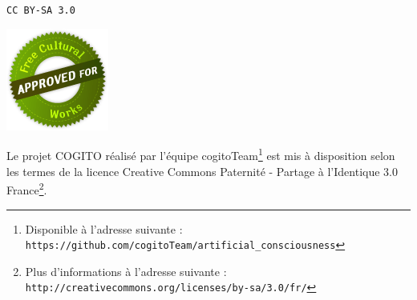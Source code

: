 \chapter*{}
\begin{center}
\texttt{\LARGE CC BY-SA 3.0}

\includegraphics[scale=0.8]{files/free}

Le projet COGITO réalisé par l'équipe cogitoTeam\footnote{Disponible à l'adresse suivante : \texttt{https://github.com/cogitoTeam/artificial\_consciousness}} est mis à disposition selon les termes de la licence Creative Commons Paternité - Partage à l'Identique 3.0 France\footnote{Plus d'informations à l'adresse suivante : \texttt{http://creativecommons.org/licenses/by-sa/3.0/fr/}}.
\end{center}
